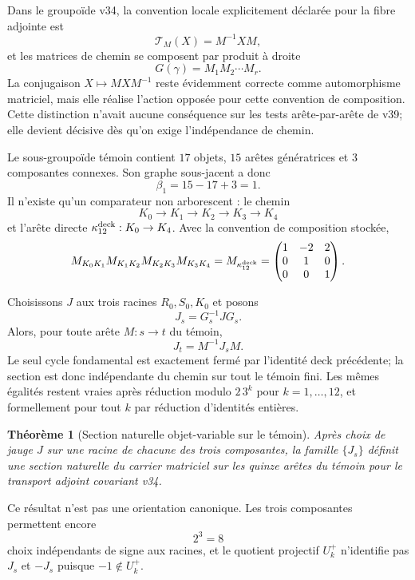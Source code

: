 \documentclass[11pt,a4paper]{article}
\newtheorem{theorem}{Théorème}[section]
\begin{document}
Dans le groupoïde v34, la convention locale explicitement déclarée pour la fibre adjointe est
\[
 \mathcal T_M(X)=M^{-1}XM,
\]
et les matrices de chemin se composent par produit à droite
\[
 G(\gamma)=M_1M_2\cdots M_r.
\]
La conjugaison $X\mapsto MXM^{-1}$ reste évidemment correcte comme automorphisme matriciel, mais elle réalise l'action opposée pour cette convention de composition. Cette distinction n'avait aucune conséquence sur les tests arête-par-arête de v39; elle devient décisive dès qu'on exige l'indépendance de chemin.

Le sous-groupoïde témoin contient $17$ objets, $15$ arêtes génératrices et $3$ composantes connexes. Son graphe sous-jacent a donc
\[
 \beta_1=15-17+3=1.
\]
Il n'existe qu'un comparateur non arborescent : le chemin
\[
 K_0\to K_1\to K_2\to K_3\to K_4
\]
et l'arête directe $\kappa_{12}^{\rm deck}:K_0\to K_4$. Avec la convention de composition stockée,
\[
 M_{K_0K_1}M_{K_1K_2}M_{K_2K_3}M_{K_3K_4}
 =M_{\kappa_{12}^{\rm deck}}
 =\begin{pmatrix}1&-2&2\\0&1&0\\0&0&1\end{pmatrix}.
\]

Choisissons $J$ aux trois racines $R_0,S_0,K_0$ et posons
\[
 \boxed{J_s=G_s^{-1}JG_s.}
\]
Alors, pour toute arête $M:s\to t$ du témoin,
\[
 \boxed{J_t=M^{-1}J_sM.}
\]
Le seul cycle fondamental est exactement fermé par l'identité deck précédente; la section est donc indépendante du chemin sur tout le témoin fini. Les mêmes égalités restent vraies après réduction modulo $2\,3^k$ pour $k=1,\ldots,12$, et formellement pour tout $k$ par réduction d'identités entières.

\begin{theorem}[Section naturelle objet-variable sur le témoin]
Après choix de jauge $J$ sur une racine de chacune des trois composantes, la famille $\{J_s\}$ définit une section naturelle du carrier matriciel sur les quinze arêtes du témoin pour le transport adjoint covariant v34.
\end{theorem}

Ce résultat n'est pas une orientation canonique. Les trois composantes permettent encore
\[
 \boxed{2^3=8}
\]
choix indépendants de signe aux racines, et le quotient projectif $U_k^+$ n'identifie pas $J_s$ et $-J_s$ puisque $-1\notin U_k^+$.
\end{document}
